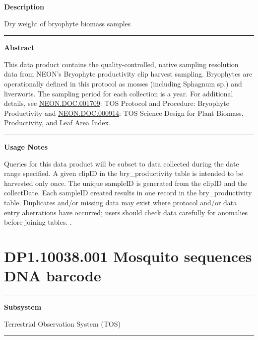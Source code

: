 \documentclass[]{article}
\begin{document}
\textbf{Description}

Dry weight of bryophyte biomass samples

\begin{center}\rule{0.5\linewidth}{\linethickness}\end{center}

\textbf{Abstract}

This data product contains the quality-controlled, native sampling
resolution data from NEON's Bryophyte productivity clip harvest
sampling. Bryophytes are operationally defined in this protocol as
mosses (including Sphagnum sp.) and liverworts. The sampling period for
each collection is a year. For additional details, see
\href{http://data.neonscience.org/api/v0/documents/NEON.DOC.001709vB}{NEON.DOC.001709}:
TOS Protocol and Procedure: Bryophyte Productivity and
\href{http://data.neonscience.org/api/v0/documents/NEON.DOC.000914vA}{NEON.DOC.000914}:
TOS Science Design for Plant Biomass, Productivity, and Leaf Area Index.

\begin{center}\rule{0.5\linewidth}{\linethickness}\end{center}

\textbf{Usage Notes}

Queries for this data product will be subset to data collected during
the date range specified. A given clipID in the bry\_productivity table
is intended to be harvested only once. The unique sampleID is generated
from the clipID and the collectDate. Each sampleID created results in
one record in the bry\_productivity table. Duplicates and/or missing
data may exist where protocol and/or data entry aberrations have
occurred; users should check data carefully for anomalies before joining
tables. \newpage
.

\section{DP1.10038.001 Mosquito sequences DNA
barcode}\label{dp1.10038.001-mosquito-sequences-dna-barcode}

\begin{center}\rule{0.5\linewidth}{\linethickness}\end{center}

\textbf{Subsystem}

Terrestrial Observation System (TOS)

\begin{center}\rule{0.5\linewidth}{\linethickness}\end{center}
\end{document}
